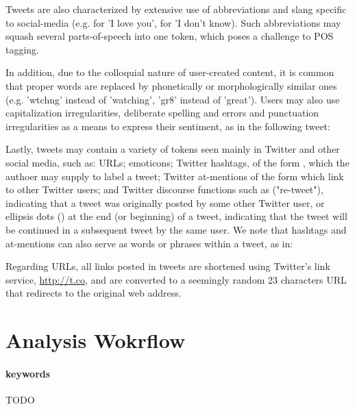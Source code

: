 \documentclass[letterpaper,twocolumn,10pt]{article}
\begin{document}
Tweets are also characterized by extensive use of abbreviations and slang specific to social-media (e.g.  for 'I love you',  for 'I don't know). Such abbreviations may squash several parts-of-speech into one token, which poses a challenge to POS tagging. 

In addition, due to the colloquial nature of user-created content, it is common that proper words are replaced by phonetically or morphologically similar ones (e.g. 'wtchng' instead of 'watching', 'gr8' instead of 'great'). Users may also use capitalization irregularities, deliberate spelling and errors and punctuation irregularities as a means to express their sentiment, as in the following tweet:

\begin{center}
	\parbox{190pt}{}
\end{center}

Lastly, tweets may contain a variety of tokens seen mainly in Twitter and other social media, such as: URLs; emoticons; Twitter hashtags, of the form , which the authoer may supply to label a tweet; Twitter at-mentions of the form  which link to other Twitter users; and Twitter discourse functions such as  ("re-tweet"), indicating that a tweet was originally posted by some other Twitter user, or ellipsis dots () at the end (or beginning) of a tweet, indicating that the tweet will be continued in a subsequent tweet by the same user. We note that hashtags and at-mentions can also serve as words or phrases within a tweet, as in:

\begin{center}
	\parbox{190pt}{}
\end{center}

Regarding URLs, all links posted in tweets are shortened using Twitter's link service, \url{http://t.co}, and are converted to a seemingly random 23 characters URL that redirects to the original web address.
	

\section{Analysis Wokrflow}

\paragraph{keywords} TODO
\end{document}
